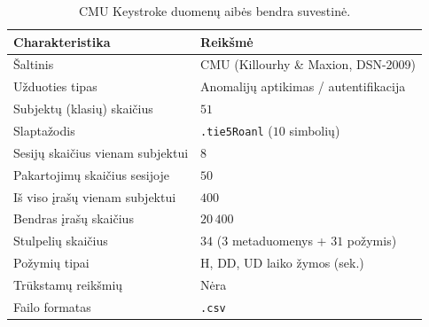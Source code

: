 \begin{table}[H]
    \centering
    \caption{CMU Keystroke duomenų aibės bendra suvestinė.}
    \begin{tabular}{|l|l|}
        \hline
        Charakteristika & Reikšmė \\
        \hline
        Šaltinis & CMU (Killourhy \& Maxion, DSN-2009) \\ \hline
        Užduoties tipas & Anomalijų aptikimas / autentifikacija \\ \hline
        Subjektų (klasių) skaičius & $51$ \\ \hline
        Slaptažodis & \texttt{.tie5Roanl} ($10$ simbolių) \\ \hline
        Sesijų skaičius vienam subjektui & $8$ \\ \hline
        Pakartojimų skaičius sesijoje & $50$ \\ \hline
        Iš viso įrašų vienam subjektui & $400$ \\ \hline
        Bendras įrašų skaičius & $20\,400$ \\ \hline
        Stulpelių skaičius & $34$ ($3$ metaduomenys + $31$ požymis) \\ \hline
        Požymių tipai & H, DD, UD laiko žymos (sek.) \\ \hline
        Trūkstamų reikšmių & Nėra \\ \hline
        Failo formatas & \texttt{.csv} \\ \hline
    \end{tabular}
    \label{tab:keystroke_suvestine}
\end{table}